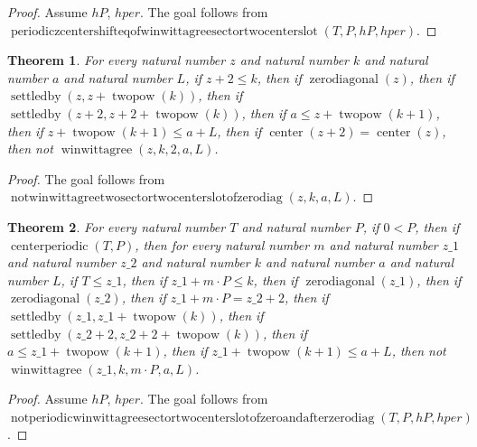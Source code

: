 \documentclass[11pt]{article}
\newtheorem{theorem}{Theorem}[section]
\theoremstyle{definition}
\begin{document}
\begin{proof}
Assume \(hP\), \(hper\).
The goal follows from \(\operatorname{periodiczcentershifteqofwinwittagreesectortwocenterslot}(T, P, hP, hper)\).
\end{proof}
\begin{theorem}
\label{ll:paper:not-winwittagree-two-sector-two-center-slot-of-zero-diag}
For every natural number \(z\) and natural number \(k\) and natural number \(a\) and natural number \(L\), if \(z + 2 \le k\), then if \(\operatorname{zerodiagonal}(z)\), then if \(\operatorname{settledby}(z, z + \operatorname{twopow}(k))\), then if \(\operatorname{settledby}(z + 2, z + 2 + \operatorname{twopow}(k))\), then if \(a \le z + \operatorname{twopow}(k + 1)\), then if \(z + \operatorname{twopow}(k + 1) \le a + L\), then if \(\operatorname{center}(z + 2) = \operatorname{center}(z)\), then not \(\operatorname{winwittagree}(z, k, 2, a, L)\).
\end{theorem}
\begin{proof}
The goal follows from \(\operatorname{notwinwittagreetwosectortwocenterslotofzerodiag}(z, k, a, L)\).
\end{proof}
\begin{theorem}
\label{ll:paper:not-periodic-winwittagree-sector-two-center-slot-of-zero-and-after-zero-diag}
For every natural number \(T\) and natural number \(P\), if \(0 < P\), then if \(\operatorname{centerperiodic}(T, P)\), then for every natural number \(m\) and natural number \(z\_1\) and natural number \(z\_2\) and natural number \(k\) and natural number \(a\) and natural number \(L\), if \(T \le z\_1\), then if \(z\_1 + m \cdot P \le k\), then if \(\operatorname{zerodiagonal}(z\_1)\), then if \(\operatorname{zerodiagonal}(z\_2)\), then if \(z\_1 + m \cdot P = z\_2 + 2\), then if \(\operatorname{settledby}(z\_1, z\_1 + \operatorname{twopow}(k))\), then if \(\operatorname{settledby}(z\_2 + 2, z\_2 + 2 + \operatorname{twopow}(k))\), then if \(a \le z\_1 + \operatorname{twopow}(k + 1)\), then if \(z\_1 + \operatorname{twopow}(k + 1) \le a + L\), then not \(\operatorname{winwittagree}(z\_1, k, m \cdot P, a, L)\).
\end{theorem}
\begin{proof}
Assume \(hP\), \(hper\).
The goal follows from \(\operatorname{notperiodicwinwittagreesectortwocenterslotofzeroandafterzerodiag}(T, P, hP, hper)\).
\end{proof}
\end{document}
